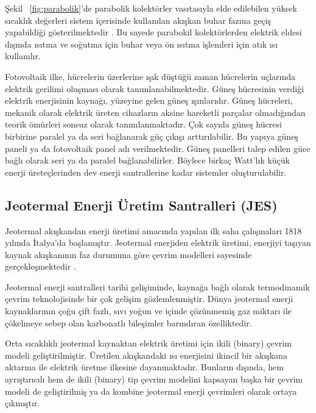 Şekil ~\ref{fig:parabolik}'de parabolik kolektörler vasıtasıyla elde edilebilen yüksek sıcaklık değerleri sistem içerisinde kullanılan akışkan buhar fazına geçiş yapabildiği gösterilmektedir \cite{AZADGILANI2021116756}. Bu sayede parabokil kolektörlerden elektrik eldesi dışında ısıtma ve soğutma için buhar veya ön ısıtma işlemleri için atık ısı kullanılır.

Fotovoltaik ilke, hücrelerin üzerlerine ışık düştüğü zaman hücrelerin uçlarında elektrik gerilimi oluşması olarak tanımlanabilmektedir. Güneş hücresinin verdiği elektrik enerjisinin kaynağı, yüzeyine gelen güneş ışınlarıdır. Güneş hücreleri, mekanik olarak elektrik üreten cihazların aksine hareketli parçalar olmadığından teorik ömürleri sonsuz olarak tanımlanmaktadır. Çok sayıda güneş hücresi birbirine paralel ya da seri bağlanarak güç çıkışı arttırılabilir. Bu yapıya güneş paneli ya da fotovoltaik panel adı verilmektedir. Güneş panelleri talep edilen güce bağlı olarak seri ya da paralel bağlanabilirler. Böylece birkaç Watt’lık küçük enerji üreteçlerinden dev enerji santrallerine kadar sistemler oluşturulabilir\cite{ramakumar1993photovoltaic}.







\subsection{Jeotermal Enerji Üretim Santralleri (JES) }



Jeotermal akışkandan enerji üretimi amacında yapılan ilk saha çalışmaları 1818 yılında İtalya'da başlamıştır. Jeotermal enerjiden elektrik üretimi, enerjiyi taşıyan kaynak akışkanının faz durumuna göre çevrim modelleri sayesinde gerçekleşmektedir \cite{Jeotarih}. 

Jeotermal enerji santralleri tarihi gelişiminde, kaynağa bağlı olarak termodinamik çevrim teknolojisinde bir çok gelişim gözlemlenmiştir. Dünya jeotermal enerji kaynaklarının çoğu çift fazlı, sıvı yoğun ve içinde çözünmemiş gaz miktarı ile çökelmeye sebep olan karbonatlı bileşimler barındıran özelliktedir.

Orta sıcaklıklı jeotermal kaynaktan elektrik üretimi için ikili (binary) çevrim modeli geliştirilmiştir. Üretilen akışkandaki ısı enerjisini ikincil bir akışkana aktarma ile elektrik üretme ilkesine dayanmaktadır. Bunların dışında, hem ayrıştırıcılı hem de ikili (binary) tip çevrim modelini kapsayan başka bir çevrim modeli de geliştirilmiş ya da kombine jeotermal enerji çevrimleri olarak ortaya çıkmıştır.



